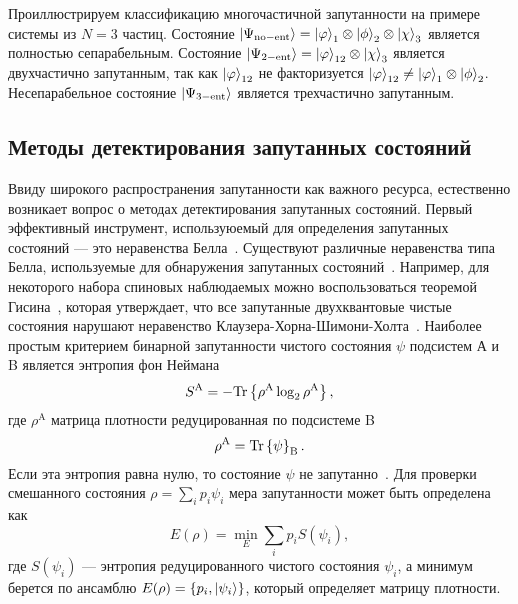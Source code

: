 \begin{definition}\label{def:manyparticle-entanglement}
  
\end{definition}

Проиллюстрируем классификацию многочастичной запутанности на примере системы из $N = 3$ частиц.
Состояние
$\left| \Psi_\mathrm{no-ent} \right\rangle = \left| \varphi \right\rangle_1 \otimes \left| \phi \right\rangle_2 \otimes \left| \chi \right\rangle_3$
является полностью сепарабельным.
Состояние
$\left| \Psi_{2-\mathrm{ent}} \right\rangle = \left| \varphi \right\rangle_{12} \otimes \left| \chi \right\rangle_3$
является двухчастично запутанным,
так как $\left| \varphi \right\rangle_{12}$ не факторизуется
$\left| \varphi \right\rangle_{12} \neq \left| \varphi \right\rangle_1 \otimes \left| \phi \right\rangle_2$.
Несепарабельное состояние $\left| \Psi_{3-\mathrm{ent}} \right\rangle$ является трехчастично запутанным.


\subsection{Методы детектирования запутанных состояний}
\label{sec:entanglement-criteria}
Ввиду широкого распространения запутанности как важного ресурса,
естественно возникает вопрос о методах детектирования запутанных состояний.
Первый эффективный инструмент,
используюемый для определения запутанных состояний --- это неравенства Белла~\cite{Bell1964}.
Существуют различные неравенства типа Белла, используемые для обнаружения запутанных состояний~\cite{Collins2002, Seevinck2001, Toth2005, Nagata2002, Yu2003, Laskowski2005, Schmid2008, Bancal2009, Svetlichny1987, Gisin1998}.
Например, для некоторого набора спиновых наблюдаемых можно воспользоваться теоремой Гисина~\cite{Gisin1991},
которая утверждает, что
все запутанные двухквантовые чистые состояния нарушают неравенство Клаузера-Хорна-Шимони-Холта~\cite{Clauser1969}.
Наиболее простым критерием бинарной запутанности чистого состояния $\psi$ подсистем А и B является энтропия фон Неймана
%
\begin{equation}
  S^\mathrm{A} = - \mathrm{Tr} \left\{ \rho^\mathrm{A} \log_2 \rho^\mathrm{A} \right\},
\end{equation}
%
где $\rho^\mathrm{A}$ матрица плотности редуцированная по подсистеме B
\begin{equation}
  \rho^\mathrm{A} = \mathrm{Tr} \left\{ \psi \right\}_\mathrm{B}.
\end{equation}
Если эта энтропия равна нулю, то состояние $\psi$ не запутанно~\cite{Bennett1996}.
Для проверки смешанного состояния $\rho = \sum_i p_i \psi_i$ мера запутанности может быть определена как
\begin{equation}
  E(\rho) = \min\limits_{E} \sum\limits_i p_i S(\psi_i),
\end{equation}
где $S(\psi_i)$ --- энтропия редуцированного чистого состояния $\psi_i$,
а минимум берется по ансамблю $E(\rho) = \left\{p_i, \left| \psi_i \right\rangle\right\}$,
который определяет матрицу плотности.

